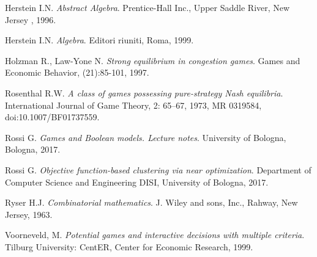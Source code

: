 \documentclass{article}
\begin{document}
\medskip
 

\begin{thebibliography}{9}
Herstein I.N.
\textit{Abstract Algebra}. 
Prentice-Hall Inc., Upper Saddle River, New Jersey , 1996.

Herstein I.N.
\textit{Algebra}. 
Editori riuniti, Roma, 1999.

Holzman R., Law-Yone N.
\textit{Strong equilibrium in congestion games}.
Games and Economic Behavior, (21):85-101, 1997.

Rosenthal R.W.
\textit{A class of games possessing pure-strategy Nash equilibria}.
International Journal of Game Theory, 2: 65–67, 1973, MR 0319584, doi:10.1007/BF01737559.

Rossi G.
\textit{Games and Boolean models. Lecture notes}.
University of Bologna, Bologna, 2017.

Rossi G.
\textit{Objective function-based clustering via near optimization}.
Department of Computer Science and Engineering DISI, University of Bologna, 2017.

Ryser H.J.
\textit{Combinatorial mathematics}.
J. Wiley and sons, Inc., Rahway, New Jersey, 1963.


Voorneveld, M. 
\textit{Potential games and interactive decisions with multiple criteria}.
Tilburg University: CentER, Center for Economic Research, 1999.

 

\end{thebibliography}
\end{document}
